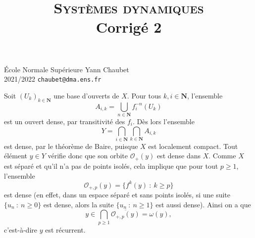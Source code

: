 \documentclass[a4paper,12pt,openany]{article}
\title{\textsc{Syst\`emes dynamiques} \\ Corrig\'e 2}
\date{}
\author{}
\theoremstyle{plain}
\theoremstyle{definition}
\newcommand{\N}{\mathbf{N}}
\begin{document}
{\noindent \'Ecole Normale Sup\'erieure  \hfill Yann Chaubet } \\
{2021/2022 \hfill \texttt{chaubet@dma.ens.fr}}

{\let\newpage\relax\maketitle}
\maketitle
{} \vspace{0.15cm}

\noindent Soit $(U_k)_{k \in \N}$ une base d'ouverts de $X$. Pour tous $k,i \in \N$, l'ensemble
$$
A_{i,k}= \bigcup_{n \in \N} f_i^{-n}(U_k)
$$
est un ouvert dense, par transitivit\'e des $f_i$. D\`es lors l'ensemble 
$$
Y = \bigcap_{i \in \N} \bigcap_{k \in \N} A_{i,k}
$$
est dense, par le th\'eor\`eme de Baire, puisque $X$ est localement compact. Tout \'el\'ement $y \in Y$ v\'erifie donc que son orbite $\mathcal{O}_+(y)$ est dense dans $X$. Comme $X$ est s\'epar\'e et qu'il n'a pas de points isol\'es, cela implique que pour tout $p \geqslant 1$, l'ensemble
$$
\mathcal{O}_{+, p}(y) = \{f^k(y)~:~k \geqslant p\}
$$
est dense (en effet, dans un espace s\'epar\'e et sans points isol\'es, si une suite $\{u_n~:~n \geqslant 0\}$ est dense, alors la suite $\{u_n~:~n\geqslant 1\}$ est aussi dense). Ainsi on a que 
$$
\displaystyle{
y \in \bigcap_{p \geqslant 1} \overline{\mathcal{O}_{+, p}(y)} = \omega(y),
}
$$
c'est-\`a-dire $y$ est r\'ecurrent.

\vspace{0.6cm}

 \vspace{1.5mm}
\end{document}
